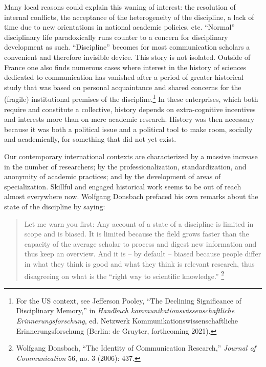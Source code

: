 \documentclass{tufte-handout}
\begin{document}
Many local reasons could explain this waning of interest: the resolution
of internal conflicts, the acceptance of the heterogeneity of the
discipline, a lack of time due to new orientations in national academic
policies, etc. ``Normal'' disciplinary life paradoxically runs counter
to a concern for disciplinary development as such. ``Discipline''
becomes for most communication scholars a convenient and therefore
invisible device. This story is not isolated. Outside of France one also
finds numerous cases where interest in the history of sciences dedicated
to communication has vanished after a period of greater historical study
that was based on personal acquaintance and shared concerns for the
(fragile) institutional premises of the
discipline.\footnote{For the US context, see Jefferson Pooley, ``The Declining Significance
  of Disciplinary Memory,'' in \emph{Handbuch
  kommunikationswissenschaftliche Erinnerungsforschung}, ed. Netzwerk
  Kommunikationswissenschaftliche Erinnerungsforschung (Berlin: de
  Gruyter, forthcoming 2021).
} In these enterprises,
which both require and constitute a collective, history depends on
extra-cognitive incentives and interests more than on mere academic
research. History was then necessary because it was both a political
issue and a political tool to make room, socially and academically, for
something that did not yet exist.

Our contemporary international contexts are characterized by a massive
increase in the number of researchers; by the professionalization,
standardization, and anonymity of academic practices; and by the
development of areas of specialization. Skillful and engaged historical
work seems to be out of reach almost everywhere now. Wolfgang Donsbach
prefaced his own remarks about the state of the discipline by saying:

\begin{quote}
Let me warn you first: Any account of a state of a discipline is limited
in scope and is biased. It is limited because the field grows faster
than the capacity of the average scholar to process and digest new
information and thus keep an overview. And it is -- by default -- biased
because people differ in what they think is good and what they think is
relevant research, thus disagreeing on what is the ``right way to
scientific knowledge.'' \footnote{Wolfgang Donsbach, ``The Identity of Communication Research,''
  \emph{Journal of Communication} 56, no. 3 (2006): 437.
}
\end{quote}
\end{document}
